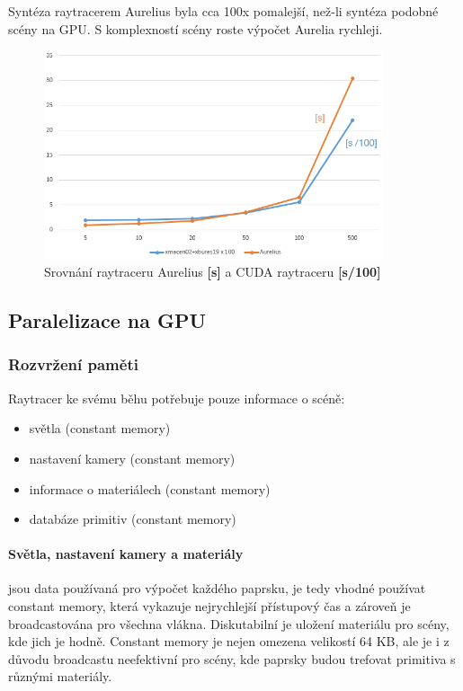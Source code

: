 \documentclass[12pt,a4paper,titlepage,final]{report}
\begin{document}
Syntéza raytracerem Aurelius byla cca 100x pomalejší, než-li syntéza podobné scény na GPU. S komplexností scény roste výpočet Aurelia rychleji.


\begin{figure}[ht]
\begin{center}
\includegraphics[width=10cm]{images/srovnani.png}
\caption{Srovnání raytraceru Aurelius \textbf{[s]} a CUDA raytraceru \textbf{[s/100]}}
\end{center}
\end{figure}

\subsection{Paralelizace na GPU}

\subsubsection{Rozvržení paměti} 

Raytracer ke svému běhu potřebuje pouze informace o scéně:
\begin{itemize}
	\item světla (constant memory)
	\item nastavení kamery (constant memory)
	\item informace o materiálech (constant memory)
	\item databáze primitiv (constant memory)
\end{itemize}

\paragraph{Světla, nastavení kamery a materiály} jsou data používaná pro výpočet každého paprsku, je tedy vhodné používat constant memory, která vykazuje nejrychlejší přístupový čas a zároveň je broadcastována pro všechna vlákna. Diskutabilní je uložení materiálu pro scény, kde jich je hodně. Constant memory je nejen omezena velikostí 64 KB, ale je i z důvodu broadcastu neefektivní pro scény, kde paprsky budou trefovat primitiva s různými materiály.
\end{document}
